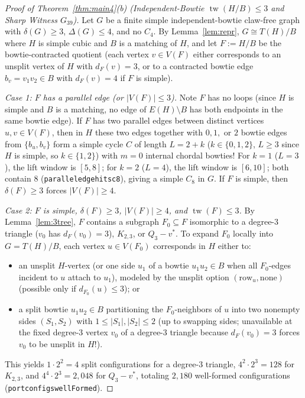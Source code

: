 \documentclass[11pt,reqno]{amsart}
\theoremstyle{plain}
\theoremstyle{definition}
\theoremstyle{remark}
\newcommand{\tw}{\operatorname{tw}}
\DeclareRobustCommand{\_}{\ifmmode\text{\textunderscore}\else\textunderscore\allowbreak\fi}
\begin{document}
\begin{proof}[Proof of Theorem~\ref{thm:main4}(b) (Independent-Bowtie $\tw(H/B) \le 3$ and Sharp Witness $G_{39}$)]
Let $G$ be a finite simple independent-bowtie claw-free graph with $\delta(G) \ge 3$, $\Delta(G) \le 4$, and no $C_4$. By Lemma~\ref{lem:repr}, $G \cong T(H)/B$ where $H$ is simple cubic and $B$ is a matching of $H$, and let $F := H/B$ be the bowtie-contracted quotient (each vertex $v \in V(F)$ either corresponds to an unsplit vertex of $H$ with $d_F(v) = 3$, or to a contracted bowtie edge $b_v = v_1 v_2 \in B$ with $d_F(v) = 4$ if $F$ is simple).

\emph{Case 1: $F$ has a parallel edge (or $|V(F)| \le 3$).}
Note $F$ has no loops (since $H$ is simple and $B$ is a matching, no edge of $E(H) \setminus B$ has both endpoints in the same bowtie edge). If $F$ has two parallel edges between distinct vertices $u, v \in V(F)$, then in $H$ these two edges together with $0, 1,$ or $2$ bowtie edges from $\{b_u, b_v\}$ form a simple cycle $C$ of length $L = 2 + k$ ($k \in \{0, 1, 2\}$, $L \ge 3$ since $H$ is simple, so $k \in \{1, 2\}$) with $m = 0$ internal chordal bowties! For $k = 1$ ($L = 3$), the lift window is $[5, 8]$; for $k = 2$ ($L = 4$), the lift window is $[6, 10]$; both contain $8$ (\texttt{parallel\_edge\_hits\_c8}), giving a simple $C_8$ in $G$. If $F$ is simple, then $\delta(F) \ge 3$ forces $|V(F)| \ge 4$.

\emph{Case 2: $F$ is simple, $\delta(F) \ge 3$, $|V(F)| \ge 4$, and $\tw(F) \le 3$.}
By Lemma~\ref{lem:3tree}, $F$ contains a subgraph $F_0 \subseteq F$ isomorphic to a degree-$3$ triangle ($v_0$ has $d_F(v_0) = 3$), $K_{2,3}$, or $Q_3 - v^*$. To expand $F_0$ locally into $G = T(H)/B$, each vertex $u \in V(F_0)$ corresponds in $H$ either to:
\begin{itemize}[leftmargin=1.6em]
  \item an unsplit $H$-vertex (or one side $u_1$ of a bowtie $u_1 u_2 \in B$ when all $F_0$-edges incident to $u$ attach to $u_1$), modeled by the unsplit option $(\mathrm{row}_u, \mathrm{none})$ (possible only if $d_{F_0}(u) \le 3$); or
  \item a split bowtie $u_1 u_2 \in B$ partitioning the $F_0$-neighbors of $u$ into two nonempty sides $(S_1, S_2)$ with $1 \le |S_1|, |S_2| \le 2$ (up to swapping sides; unavailable at the fixed degree-$3$ vertex $v_0$ of a degree-$3$ triangle because $d_F(v_0) = 3$ forces $v_0$ to be unsplit in $H$!).
\end{itemize}
This yields $1 \cdot 2^2 = 4$ split configurations for a degree-$3$ triangle, $4^2 \cdot 2^3 = 128$ for $K_{2,3}$, and $4^4 \cdot 2^3 = 2{,}048$ for $Q_3 - v^*$, totaling $2{,}180$ well-formed configurations (\texttt{port\_configs\_wellFormed}).


\end{proof}
\end{document}
